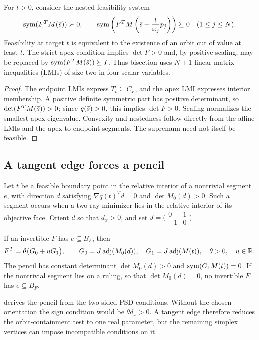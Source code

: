 \begin{proposition}
\label{fd:orbit-sdp}
For $t>0$, consider the nested feasibility system
\[
 \operatorname{sym}(F^TM(\bar s))\succ0,\qquad
 \operatorname{sym}\left(F^TM\left(\bar s+\frac{t}{\omega_j}p_j\right)\right)
 \succeq0\quad(1\le j\le N).
\]
Feasibility at target $t$ is equivalent to the existence of an orbit cut
of value at least $t$. The strict apex condition implies $\det F>0$ and,
by positive scaling, may be replaced by
$\operatorname{sym}(F^TM(\bar s))\succeq I$. Thus bisection uses $N+1$ linear matrix inequalities (LMIs) of size
two in four scalar variables.
\end{proposition}
\begin{proof}
The endpoint LMIs express $T_t\subseteq C_F$, and the apex LMI expresses
interior membership. A positive definite symmetric part has positive
determinant, so $\det(F^TM(\bar s))>0$; since $q(\bar s)>0$, this implies
$\det F>0$. Scaling normalizes the smallest apex eigenvalue. Convexity
and nestedness follow directly from the affine LMIs and the apex-to-endpoint
segments. The supremum need not itself be feasible.
\end{proof}

\subsection{A tangent edge forces a pencil}

Let $t$ be a feasible boundary point in the relative interior of a
nontrivial segment $e$, with direction $d$ satisfying
$\nabla q(t)^Td=0$ and $\det M_0(d)>0$. Such a segment occurs when a
two-ray minimizer lies in the relative interior of its objective face.
Orient $d$ so that $d_x>0$, and set
$J=\bigl(\begin{smallmatrix}0&1\\-1&0\end{smallmatrix}\bigr)$.

\begin{lemma}\label{fd:tangent-pencil}
If an invertible $F$ has $e\subseteq B_F$, then
\begin{equation}\label{fd:pencil}
 F^T=\theta\bigl(G_0+uG_1\bigr),\qquad
 G_0=J\operatorname{adj}(M_0(d)),\quad G_1=J\operatorname{adj}(M(t)),\quad
 \theta>0,\quad u\in\mathbb R.
\end{equation}
The pencil has constant determinant $\det M_0(d)>0$ and
$\operatorname{sym}(G_1M(t))=0$. If the nontrivial segment lies on a ruling, so that
$\det M_0(d)=0$, no invertible $F$ has $e\subseteq B_F$.
\end{lemma}
 derives the pencil from the two-sided PSD
conditions. Without the chosen orientation the sign condition would
be $\theta d_x>0$. A tangent edge therefore reduces the orbit-containment
test to one real parameter, but the remaining simplex vertices can impose
incompatible conditions on it.

